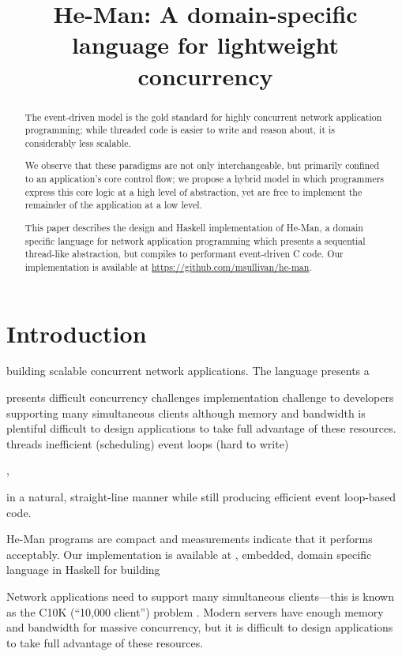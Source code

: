 \documentclass[preprint]{sigplanconf}
\title{He-Man: A domain-specific language for lightweight concurrency}
\begin{document}
\maketitle


\begin{abstract}
The event-driven model is the gold standard for highly concurrent network
application programming; while threaded code is easier to write and reason
about, it is considerably less scalable.

We observe that these paradigms are not only interchangeable, but primarily
confined to an application's core control flow; we propose a hybrid model in
which programmers express this core logic at a high level of abstraction, yet
are free to implement the remainder of the application at a low level.

This paper describes the design and Haskell implementation of He-Man, a domain
specific language for network application programming which presents a
sequential thread-like abstraction, but compiles to performant event-driven C
code. Our implementation is available at
\url{https://github.com/msullivan/he-man}.
\end{abstract}

\section{Introduction}
building scalable concurrent network applications. The
language presents a 

presents difficult concurrency challenges 
implementation challenge to developers
supporting many simultaneous clients
although memory and bandwidth is plentiful
difficult to design applications
to take full advantage of these resources.
threads inefficient (scheduling)
event loops (hard to write)

\cite{LauerNeedham}, 

in a natural, straight-line manner while
still producing efficient event loop-based code. 

He-Man programs are compact and
measurements indicate that it performs acceptably. Our implementation is
available at
, embedded, domain specific language in Haskell for
building 


Network applications need to support many simultaneous clients---this is known
as the C10K (``10,000 client'') problem \cite{Kegel}. Modern servers have enough
memory and bandwidth for massive concurrency, but it is difficult to design
applications to take full advantage of these resources.
\end{document}
